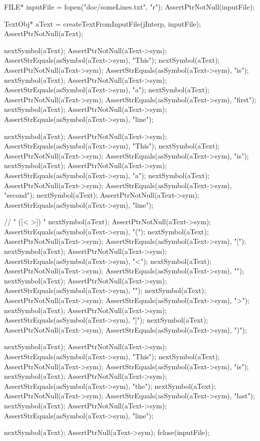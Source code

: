  FILE* inputFile = fopen("doc/someLines.txt", "r");
  AssertPtrNotNull(inputFile);
  
  TextObj* aText = createTextFromInputFile(jInterp, inputFile);
  AssertPtrNotNull(aText);

  nextSymbol(aText);
  AssertPtrNotNull(aText->sym);
  AssertStrEquals(asSymbol(aText->sym), "This");
  nextSymbol(aText);
  AssertPtrNotNull(aText->sym);
  AssertStrEquals(asSymbol(aText->sym), "is");
  nextSymbol(aText);
  AssertPtrNotNull(aText->sym);
  AssertStrEquals(asSymbol(aText->sym), "a");
  nextSymbol(aText);
  AssertPtrNotNull(aText->sym);
  AssertStrEquals(asSymbol(aText->sym), "first");
  nextSymbol(aText);
  AssertPtrNotNull(aText->sym);
  AssertStrEquals(asSymbol(aText->sym), "line");

  nextSymbol(aText);
  AssertPtrNotNull(aText->sym);
  AssertStrEquals(asSymbol(aText->sym), "This");
  nextSymbol(aText);
  AssertPtrNotNull(aText->sym);
  AssertStrEquals(asSymbol(aText->sym), "is");
  nextSymbol(aText);
  AssertPtrNotNull(aText->sym);
  AssertStrEquals(asSymbol(aText->sym), "a");
  nextSymbol(aText);
  AssertPtrNotNull(aText->sym);
  AssertStrEquals(asSymbol(aText->sym), "second");
  nextSymbol(aText);
  AssertPtrNotNull(aText->sym);
  AssertStrEquals(asSymbol(aText->sym), "line");

  // " ([<{ }>]) "
  nextSymbol(aText);
  AssertPtrNotNull(aText->sym);
  AssertStrEquals(asSymbol(aText->sym), "(");
  nextSymbol(aText);
  AssertPtrNotNull(aText->sym);
  AssertStrEquals(asSymbol(aText->sym), "[");
  nextSymbol(aText);
  AssertPtrNotNull(aText->sym);
  AssertStrEquals(asSymbol(aText->sym), "<");
  nextSymbol(aText);
  AssertPtrNotNull(aText->sym);
  AssertStrEquals(asSymbol(aText->sym), "{");
  nextSymbol(aText);
  AssertPtrNotNull(aText->sym);
  AssertStrEquals(asSymbol(aText->sym), "}");
  nextSymbol(aText);
  AssertPtrNotNull(aText->sym);
  AssertStrEquals(asSymbol(aText->sym), ">");
  nextSymbol(aText);
  AssertPtrNotNull(aText->sym);
  AssertStrEquals(asSymbol(aText->sym), "]");
  nextSymbol(aText);
  AssertPtrNotNull(aText->sym);
  AssertStrEquals(asSymbol(aText->sym), ")");

  nextSymbol(aText);
  AssertPtrNotNull(aText->sym);
  AssertStrEquals(asSymbol(aText->sym), "This");
  nextSymbol(aText);
  AssertPtrNotNull(aText->sym);
  AssertStrEquals(asSymbol(aText->sym), "is");
  nextSymbol(aText);
  AssertPtrNotNull(aText->sym);
  AssertStrEquals(asSymbol(aText->sym), "the");
  nextSymbol(aText);
  AssertPtrNotNull(aText->sym);
  AssertStrEquals(asSymbol(aText->sym), "last");
  nextSymbol(aText);
  AssertPtrNotNull(aText->sym);
  AssertStrEquals(asSymbol(aText->sym), "line");

  nextSymbol(aText);
  AssertPtrNull(aText->sym);
  fclose(inputFile);
\stopCTest
\stopTestCase
\stopTestSuite
